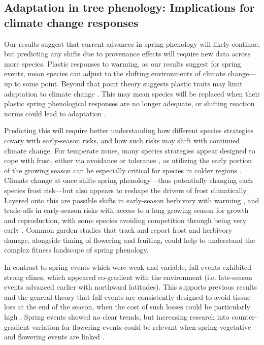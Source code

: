 \documentclass[12pt]{article}
\begin{document}
\subsection{Adaptation in tree phenology: Implications for climate change responses}

Our results suggest that current advances in spring phenology will likely continue, but predicting any shifts due to provenance effects will require new data across more species. Plastic responses to warming, as our results suggest for spring events, mean species can adjust to the shifting environments of climate change---up to some point. Beyond that point theory suggests plastic traits may limit adaptation to climate change \citep{chevin10}. This may mean species will be replaced when their plastic spring phenological responses are no longer adequate, or shifting reaction norms could lead to adaptation \citep{gauzere2020}. 

Predicting this will require better understanding how different species strategies covary with early-season risks, and how such risks may shift with continued climate change. For temperate zones, many species strategies appear designed to cope with frost, either via avoidance or tolerance \citep{alberto11, lenz16, allevato19}, as utilizing the early portion of the growing season can be especially critical for species in colder regions \citep{morin07, dantec15}. Climate change at once shifts spring phenology---thus potentially changing each species frost risk---but also appears to reshape the drivers of frost climatically \citep{cat2021pep}. Layered onto this are possible shifts in early-season herbivory with warming \citep{meineke2019}, and trade-offs in early-season risks with access to a long growing season for growth and reproduction, with some species avoiding competition through being very early \citep{guo22}. Common garden studies that track and report frost and herbivory damage, alongside timing of flowering and fruiting, could help to understand the complex fitness landscape of spring phenology. 

In contrast to spring events which were weak and variable, fall events exhibited strong clines, which appeared co-gradient with the environment (i.e. late-season events advanced earlier with northward latitudes). This supports previous results and the general theory that fall events are consistently designed to avoid tissue loss at the end of the season, when the cost of such losses could be particularly high \citep{AitkenBemmels16, Alberto13}. Spring events showed no clear trends, but increasing research into counter-gradient variation for flowering events could be relevant when spring vegetative and flowering events are linked \citep{dan2021nph}. 
\end{document}
